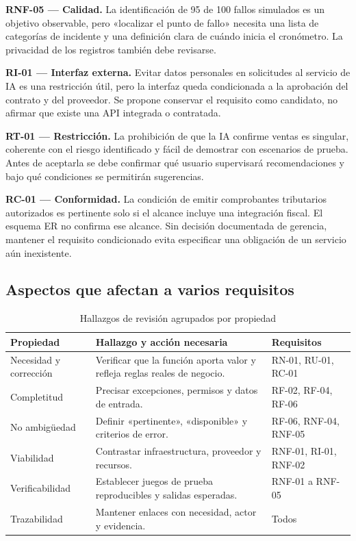 \textbf{RNF-05 — Calidad.} La identificación de 95 de 100 fallos simulados es un objetivo observable, pero «localizar el punto de fallo» necesita una lista de categorías de incidente y una definición clara de cuándo inicia el cronómetro. La privacidad de los registros también debe revisarse.

\textbf{RI-01 — Interfaz externa.} Evitar datos personales en solicitudes al servicio de IA es una restricción útil, pero la interfaz queda condicionada a la aprobación del contrato y del proveedor. Se propone conservar el requisito como candidato, no afirmar que existe una API integrada o contratada.

\textbf{RT-01 — Restricción.} La prohibición de que la IA confirme ventas es singular, coherente con el riesgo identificado y fácil de demostrar con escenarios de prueba. Antes de aceptarla se debe confirmar qué usuario supervisará recomendaciones y bajo qué condiciones se permitirán sugerencias.

\textbf{RC-01 — Conformidad.} La condición de emitir comprobantes tributarios autorizados es pertinente solo si el alcance incluye una integración fiscal. El esquema ER no confirma ese alcance. Sin decisión documentada de gerencia, mantener el requisito condicionado evita especificar una obligación de un servicio aún inexistente.

\subsection{Aspectos que afectan a varios requisitos}
\begin{table}[!ht]
\centering\scriptsize
\caption{Hallazgos de revisión agrupados por propiedad}
\label{tab:revision14}
\begin{tabularx}{\columnwidth}{@{}P{1.5cm}Y P{1.0cm}@{}}
\toprule Propiedad & Hallazgo y acción necesaria & Requisitos\\\midrule
Necesidad y corrección & Verificar que la función aporta valor y refleja reglas reales de negocio. & RN-01, RU-01, RC-01\\
Completitud & Precisar excepciones, permisos y datos de entrada. & RF-02, RF-04, RF-06\\
No ambigüedad & Definir «pertinente», «disponible» y criterios de error. & RF-06, RNF-04, RNF-05\\
Viabilidad & Contrastar infraestructura, proveedor y recursos. & RNF-01, RI-01, RNF-02\\
Verificabilidad & Establecer juegos de prueba reproducibles y salidas esperadas. & RNF-01 a RNF-05\\
Trazabilidad & Mantener enlaces con necesidad, actor y evidencia. & Todos\\
\bottomrule
\end{tabularx}
\end{table}

